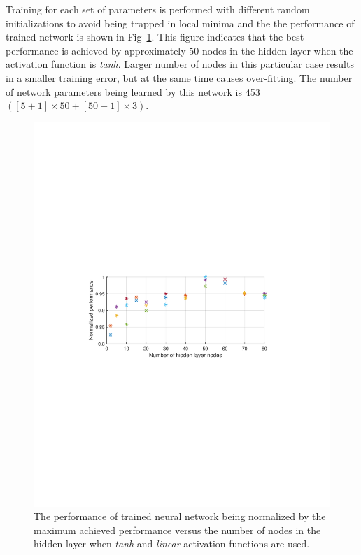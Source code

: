 \documentclass[twocolumn,10pt]{asme2e}
\begin{document}
Training for each set of parameters is performed with different random initializations to avoid being trapped in local minima and the the performance of trained network is shown in Fig~\ref{fig:perf1}. This figure indicates that the best performance is achieved by approximately $50$ nodes in the hidden layer when the activation function is \textit{tanh}. Larger number of nodes  in this particular case results in a smaller training error, but at the same time causes over-fitting. The number of network parameters being learned by this network is 453 $\left([5+1]\times50+[50+1]\times 3\right)$.
\begin{figure}[t]
	\centering
	\includegraphics[width=1\linewidth]{./Figures/perf1}
	\caption{ The performance of trained neural network being normalized by the maximum achieved performance versus the number of nodes in the hidden layer when \emph{tanh} and \emph{linear} activation functions are used. }
	\label{fig:perf1}
\end{figure} 
\end{document}
